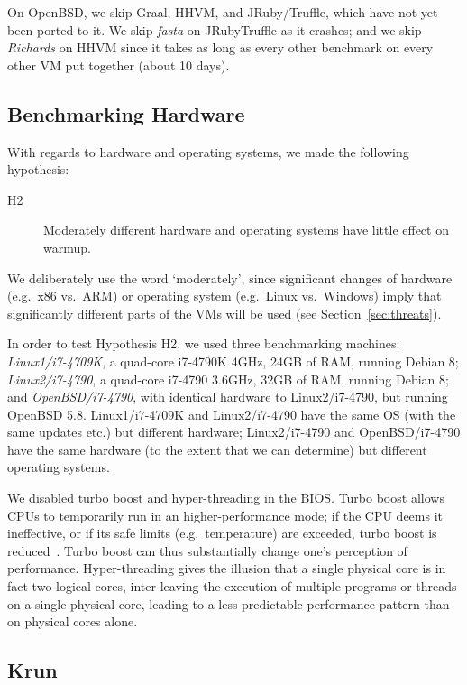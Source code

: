 \documentclass[preprint,numbers,10pt]{sigplanconf}
\newcommand{\krun}{Krun\xspace}
\newcommand{\hyptwo}{H2\xspace}
\newcommand{\richards}{\emph{Richards}\xspace}
\newcommand{\fasta}{\emph{fasta}\xspace}
\newcommand{\bencherthree}{Linux1/i7-4709K\xspace}
\newcommand{\bencherfive}{Linux2/i7-4790\xspace}
\newcommand{\benchersix}{OpenBSD/i7-4790\xspace}
\begin{document}
On OpenBSD, we skip Graal, HHVM, and JRuby/Truffle, which have not yet been
ported to it. We skip \fasta on JRubyTruffle as it crashes;
and we skip \richards on HHVM since it takes as long as every other benchmark
on every other VM put together (about 10 days).


\subsection{Benchmarking Hardware}

With regards to hardware and operating systems, we made the
following hypothesis:
\begin{description}
  \item[\hyptwo] Moderately different hardware and operating systems have little effect on warmup.
\end{description}
We deliberately use the word `moderately', since significant changes of hardware
(e.g.~x86 vs.~ARM) or operating system (e.g.~Linux vs.~Windows) imply that
significantly different parts of the VMs will be used (see Section~\ref{sec:threats}).

In order to test Hypothesis H2, we used three benchmarking machines: \emph{\bencherthree}, a quad-core i7-4790K
4GHz, 24GB of RAM, running Debian 8; \emph{\bencherfive}, a quad-core i7-4790
3.6GHz, 32GB of RAM, running Debian 8; and \emph{\benchersix}, with identical
hardware to \bencherfive, but running OpenBSD 5.8. \bencherthree and \bencherfive
have the same OS (with the same updates etc.) but different hardware; \bencherfive
and \benchersix have the same hardware (to the extent that we can determine)
but different operating systems.

We disabled turbo boost and hyper-threading in the BIOS. Turbo boost
allows CPUs to temporarily run in an higher-performance
mode; if the CPU deems it ineffective, or if its safe limits (e.g.~temperature) are exceeded,
turbo boost is reduced~\cite{charles09turboboost}. Turbo boost
can thus substantially change one's
perception of performance. Hyper-threading gives the illusion that a single
physical core is in fact two logical cores, inter-leaving the
execution of multiple programs or threads on a single physical core,
leading to a less predictable performance pattern
than on physical cores alone.


\subsection{\krun}
\label{krun}
\end{document}
